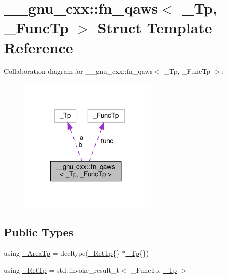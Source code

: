 \hypertarget{struct____gnu__cxx_1_1fn__qaws}{}\section{\+\_\+\+\_\+gnu\+\_\+cxx\+:\+:fn\+\_\+qaws$<$ \+\_\+\+Tp, \+\_\+\+Func\+Tp $>$ Struct Template Reference}
\label{struct____gnu__cxx_1_1fn__qaws}


Collaboration diagram for \+\_\+\+\_\+gnu\+\_\+cxx\+:\+:fn\+\_\+qaws$<$ \+\_\+\+Tp, \+\_\+\+Func\+Tp $>$\+:
\nopagebreak
\begin{figure}[H]
\begin{center}
\leavevmode
\includegraphics[width=192pt]{struct____gnu__cxx_1_1fn__qaws__coll__graph}
\end{center}
\end{figure}
\subsection*{Public Types}
\begin{DoxyCompactItemize}
\item 
using \hyperlink{struct____gnu__cxx_1_1fn__qaws_af9bc03c839ab7dc2e591b06cd3957a21}{\+\_\+\+Area\+Tp} = decltype(\hyperlink{struct____gnu__cxx_1_1fn__qaws_afb28f16c42d0f494bfe2d48e2524a5b1}{\+\_\+\+Ret\+Tp}\{\} $\ast$\hyperlink{namespace____gnu__cxx_a3b19a9c800ca194374ef9172290f7d79}{\+\_\+\+Tp}\{\})
\item 
using \hyperlink{struct____gnu__cxx_1_1fn__qaws_afb28f16c42d0f494bfe2d48e2524a5b1}{\+\_\+\+Ret\+Tp} = std\+::invoke\+\_\+result\+\_\+t$<$ \+\_\+\+Func\+Tp, \hyperlink{namespace____gnu__cxx_a3b19a9c800ca194374ef9172290f7d79}{\+\_\+\+Tp} $>$
\end{DoxyCompactItemize}
